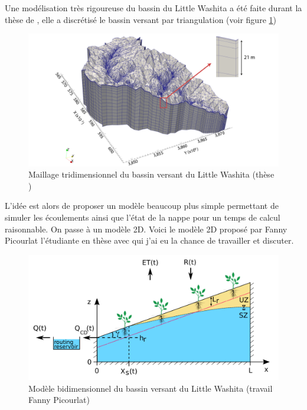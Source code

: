 \documentclass[a4paper,11pt]{article}
\numberwithin{equation}{section}
\begin{document}
Une modélisation très rigoureuse du bassin du Little Washita a été faite durant la thèse de \cite{maquin2016developpement}, elle a discrétisé le bassin versant par triangulation (voir figure \ref{fig-Little Washita 3D})

\begin{figure}[H]
	\label{fig-Little Washita 3D}
	\begin{center}
		\includegraphics[scale=0.2]{images/little_washita3D.png}
	\end{center}
	\caption{Maillage tridimensionnel du bassin versant du Little Washita (thèse \cite{maquin2016developpement})}
\end{figure}

L'idée est alors de proposer un modèle beaucoup plus simple permettant de simuler les écoulements ainsi que l'état de la nappe pour un temps de calcul raisonnable. On passe à un modèle 2D. Voici le modèle 2D proposé par Fanny Picourlat l'étudiante en thèse avec qui j'ai eu la chance de travailler et discuter. 

\begin{figure}[H]
	\label{fig-Little Washita 2D}
	\begin{center}
		\includegraphics[scale=0.2]{images/upscaling_Little_Washita2D.png}
	\end{center}
	\caption{Modèle bidimensionnel du bassin versant du Little Washita (travail Fanny Picourlat)}
\end{figure}
\end{document}
